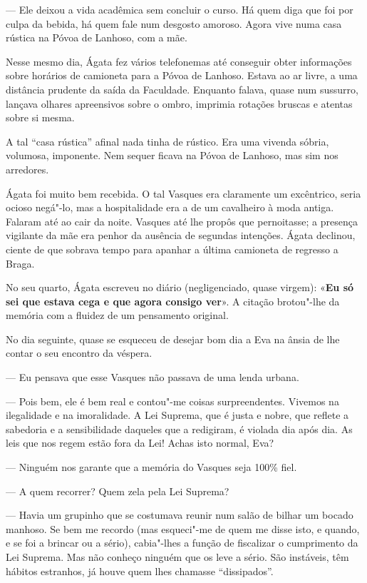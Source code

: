 --- Ele deixou a vida acadêmica sem concluir o curso. Há quem diga que
foi por culpa da bebida, há quem fale num desgosto amoroso. Agora
vive numa casa rústica na Póvoa de Lanhoso, com a mãe.

Nesse mesmo dia, Ágata fez vários telefonemas até conseguir obter
informações sobre horários de camioneta para a Póvoa de Lanhoso. Estava
ao ar livre, a uma distância prudente da saída da Faculdade. Enquanto
falava, quase num sussurro, lançava olhares apreensivos sobre o ombro,
imprimia rotações bruscas e atentas sobre si mesma.

A tal ``casa rústica'' afinal nada tinha de rústico. Era uma vivenda
sóbria, volumosa, imponente. Nem sequer ficava na Póvoa de Lanhoso, mas
sim nos arredores.

Ágata foi muito bem recebida. O tal Vasques era claramente um
excêntrico, seria ocioso negá"-lo, mas a hospitalidade era a de um
cavalheiro à moda antiga. Falaram até ao cair da noite. Vasques até lhe
propôs que pernoitasse; a presença vigilante da mãe era penhor da
ausência de segundas intenções. Ágata declinou, ciente de que sobrava
tempo para apanhar a última camioneta de regresso a Braga.

No seu quarto, Ágata escreveu no diário (negligenciado, quase virgem):
«\textbf{Eu só sei que estava cega e que agora consigo ver}». A
citação brotou"-lhe da memória com a fluidez de um pensamento original.

No dia seguinte, quase se esqueceu de desejar bom dia a Eva na ânsia de
lhe contar o seu encontro da véspera.

--- Eu pensava que esse Vasques não passava de uma lenda urbana.

--- Pois bem, ele é bem real e contou"-me coisas surpreendentes.
Vivemos na ilegalidade e na imoralidade. A Lei Suprema, que é justa
e nobre, que reflete a sabedoria e a sensibilidade daqueles que a
redigiram, é violada dia após dia. As leis que
nos regem estão fora da Lei! Achas isto normal, Eva?

--- Ninguém nos garante que a memória do Vasques seja 100\% fiel.

--- A quem recorrer? Quem zela pela Lei Suprema?

--- Havia um grupinho que se costumava reunir num salão de bilhar um
  bocado manhoso. Se bem me recordo (mas esqueci"-me de quem me disse
  isto, e quando, e se foi a brincar ou a sério), cabia"-lhes a função de
  fiscalizar o cumprimento da Lei Suprema. Mas não conheço ninguém que
  os leve a sério. São instáveis, têm hábitos estranhos, já houve quem
  lhes chamasse ``dissipados''.

